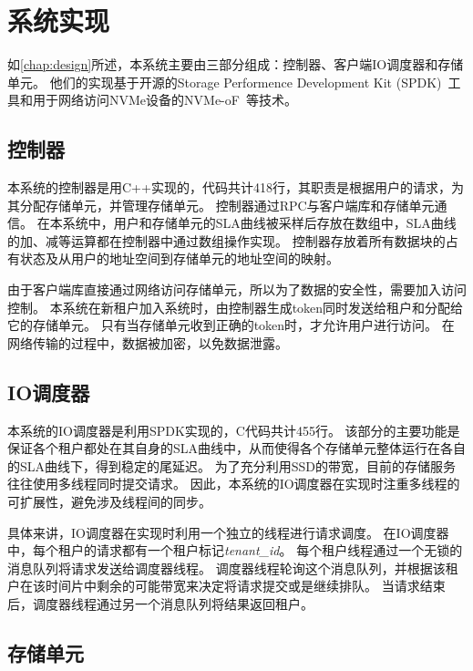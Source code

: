
\chapter{系统实现}
\label{chap:impl}

如\autoref{chap:design}所述，本系统主要由三部分组成：控制器、客户端IO调度器和存储单元。
他们的实现基于开源的Storage Performence Development Kit (SPDK)~\cite{yang2017spdk}工具和用于网络访问NVMe设备的NVMe-oF~\cite{nvmeof2016}等技术。

\section{控制器}
\label{sec:impl-controller}

本系统的控制器是用C++实现的，代码共计418行，其职责是根据用户的请求，为其分配存储单元，并管理存储单元。
控制器通过RPC与客户端库和存储单元通信。
在本系统中，用户和存储单元的SLA曲线被采样后存放在数组中，SLA曲线的加、减等运算都在控制器中通过数组操作实现。
控制器存放着所有数据块的占有状态及从用户的地址空间到存储单元的地址空间的映射。

由于客户端库直接通过网络访问存储单元，所以为了数据的安全性，需要加入访问控制。
本系统在新租户加入系统时，由控制器生成token同时发送给租户和分配给它的存储单元。
只有当存储单元收到正确的token时，才允许用户进行访问。
在网络传输的过程中，数据被加密，以免数据泄露。

\section{IO调度器}
\label{sec:impl-client}

本系统的IO调度器是利用SPDK实现的，C代码共计455行。
该部分的主要功能是保证各个租户都处在其自身的SLA曲线中，从而使得各个存储单元整体运行在各自的SLA曲线下，得到稳定的尾延迟。
为了充分利用SSD的带宽，目前的存储服务往往使用多线程同时提交请求。
因此，本系统的IO调度器在实现时注重多线程的可扩展性，避免涉及线程间的同步。

具体来讲，IO调度器在实现时利用一个独立的线程进行请求调度。
在IO调度器中，每个租户的请求都有一个租户标记\textit{tenant\_id}。
每个租户线程通过一个无锁的消息队列将请求发送给调度器线程。
调度器线程轮询这个消息队列，并根据该租户在该时间片中剩余的可能带宽来决定将请求提交或是继续排队。
当请求结束后，调度器线程通过另一个消息队列将结果返回租户。

\section{存储单元}
\label{sec:impl-storage-unit}

